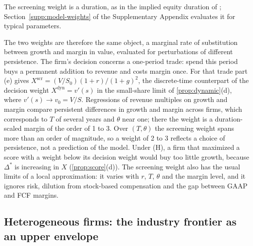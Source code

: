 The screening weight is a duration, as in the implied equity duration of \citet{dechow2004implied}; Section~\ref{supp:model-weights} of the Supplementary Appendix evaluates it for typical parameters.

The two weights are therefore the same object, a marginal rate of substitution between growth and margin in value, evaluated for perturbations of different persistence. The firm's decision concerns a one-period trade: spend this period buys a permanent addition to revenue and costs margin once. For that trade part (e) gives $X^{\mathrm{scr}}=(V/S_0)(1+r)/(1+g)^2$, the discrete-time counterpart of the decision weight $X^{\mathrm{dyn}}=v'(s)$ in the small-share limit of \autoref{prop:dynamic}(d), where $v'(s)\to v_0=V/S$. Regressions of revenue multiples on growth and margin compare persistent differences in growth and margin across firms, which corresponds to $T$ of several years and $\theta$ near one; there the weight is a duration-scaled margin of the order of 1 to 3. Over $(T,\theta)$ the screening weight spans more than an order of magnitude, so a weight of 2 to 3 reflects a choice of persistence, not a prediction of the model. Under (H), a firm that maximized a score with a weight below its decision weight would buy too little growth, because $\Delta^*$ is increasing in $X$ (\autoref{prop:score}(d)). The screening weight also has the usual limits of a local approximation: it varies with $r$, $T$, $\theta$ and the margin level, and it ignores risk, dilution from stock-based compensation and the gap between GAAP and FCF margins.

\providecommand{\PsiSlopeOp}{\textbf{[$\Psi_\chi$ slope, GAAP]}}
\providecommand{\PsiSlopeCash}{\textbf{[$\Psi_\chi$ slope, cash]}}
\subsection{Heterogeneous firms: the industry frontier as an upper envelope}\label{sec:model-industry}

